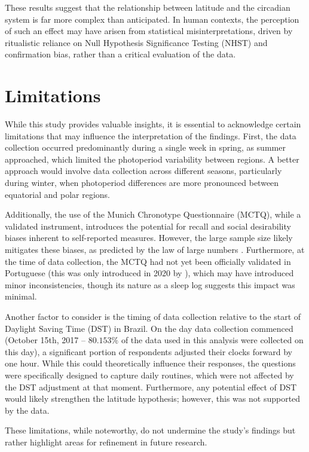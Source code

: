 \documentclass[
12pt,
openright,
oneside,
a4paper,
chapter=TITLE,
section=TITLE,
french,
spanish,
brazil,
english
]{abntex2}
\begin{document}
These results suggest that the relationship between latitude and the
circadian system is far more complex than anticipated. In human
contexts, the perception of such an effect may have arisen from
statistical misinterpretations, driven by ritualistic reliance on Null
Hypothesis Significance Testing (NHST) and confirmation bias, rather
than a critical evaluation of the data.

\section{Limitations}\label{limitations}

While this study provides valuable insights, it is essential to
acknowledge certain limitations that may influence the interpretation of
the findings. First, the data collection occurred predominantly during a
single week in spring, as summer approached, which limited the
photoperiod variability between regions. A better approach would involve
data collection across different seasons, particularly during winter,
when photoperiod differences are more pronounced between equatorial and
polar regions.

Additionally, the use of the Munich Chronotype Questionnaire (MCTQ),
while a validated instrument, introduces the potential for recall and
social desirability biases inherent to self-reported measures. However,
the large sample size likely mitigates these biases, as predicted by the
law of large numbers \autocite[352]{degroot2012}. Furthermore, at the
time of data collection, the MCTQ had not yet been officially validated
in Portuguese (this was only introduced in 2020 by
\textcite{reis2020a}), which may have introduced minor inconsistencies,
though its nature as a sleep log suggests this impact was minimal.

Another factor to consider is the timing of data collection relative to
the start of Daylight Saving Time (DST) in Brazil. On the day data
collection commenced (October 15th, 2017 -- \(80.153\%\) of the data
used in this analysis were collected on this day), a significant portion
of respondents adjusted their clocks forward by one hour. While this
could theoretically influence their responses, the questions were
specifically designed to capture daily routines, which were not affected
by the DST adjustment at that moment. Furthermore, any potential effect
of DST would likely strengthen the latitude hypothesis; however, this
was not supported by the data.

These limitations, while noteworthy, do not undermine the study's
findings but rather highlight areas for refinement in future research.
\end{document}
